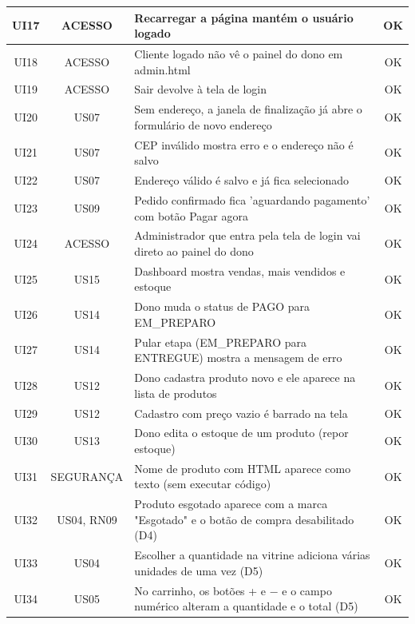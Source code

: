 \begin{longtable}{|c|c|p{9.4cm}|c|}
UI17 & ACESSO & Recarregar a página mantém o usuário logado & \cellcolor{green!20}OK \\ \hline
UI18 & ACESSO & Cliente logado não vê o painel do dono em admin.html & \cellcolor{green!20}OK \\ \hline
UI19 & ACESSO & Sair devolve à tela de login & \cellcolor{green!20}OK \\ \hline
UI20 & US07 & Sem endereço, a janela de finalização já abre o formulário de novo endereço & \cellcolor{green!20}OK \\ \hline
UI21 & US07 & CEP inválido mostra erro e o endereço não é salvo & \cellcolor{green!20}OK \\ \hline
UI22 & US07 & Endereço válido é salvo e já fica selecionado & \cellcolor{green!20}OK \\ \hline
UI23 & US09 & Pedido confirmado fica 'aguardando pagamento' com botão Pagar agora & \cellcolor{green!20}OK \\ \hline
UI24 & ACESSO & Administrador que entra pela tela de login vai direto ao painel do dono & \cellcolor{green!20}OK \\ \hline
UI25 & US15 & Dashboard mostra vendas, mais vendidos e estoque & \cellcolor{green!20}OK \\ \hline
UI26 & US14 & Dono muda o status de PAGO para EM\_PREPARO & \cellcolor{green!20}OK \\ \hline
UI27 & US14 & Pular etapa (EM\_PREPARO para ENTREGUE) mostra a mensagem de erro & \cellcolor{green!20}OK \\ \hline
UI28 & US12 & Dono cadastra produto novo e ele aparece na lista de produtos & \cellcolor{green!20}OK \\ \hline
UI29 & US12 & Cadastro com preço vazio é barrado na tela & \cellcolor{green!20}OK \\ \hline
UI30 & US13 & Dono edita o estoque de um produto (repor estoque) & \cellcolor{green!20}OK \\ \hline
UI31 & SEGURANÇA & Nome de produto com HTML aparece como texto (sem executar código) & \cellcolor{green!20}OK \\ \hline
UI32 & US04, RN09 & Produto esgotado aparece com a marca "Esgotado" e o botão de compra desabilitado (D4) & \cellcolor{green!20}OK \\ \hline
UI33 & US04 & Escolher a quantidade na vitrine adiciona várias unidades de uma vez (D5) & \cellcolor{green!20}OK \\ \hline
UI34 & US05 & No carrinho, os botões + e − e o campo numérico alteram a quantidade e o total (D5) & \cellcolor{green!20}OK \\ \hline

\end{longtable}
